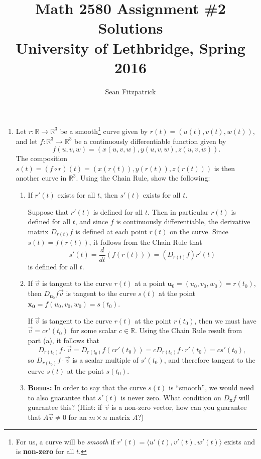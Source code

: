 \documentclass[letterpaper,12pt]{article}
\title{Math 2580 Assignment \#2 Solutions\\University of Lethbridge, Spring 2016}
\author{Sean Fitzpatrick}
\newcommand{\R}{\mathbb{R}}
\begin{document}
 \maketitle



\begin{enumerate}
 \item Let $r:\R\to \R^3$ be a smooth\footnote{For us, a curve will be {\em smooth} if $r'(t)=\langle u'(t), v'(t), w'(t)\rangle$ exists and is {\bf non-zero} for all $t$.} curve given by $r(t)=(u(t),v(t),w(t))$, and let $f:\R^3\to\R^3$ be a continuously differentiable function given by
\[
 f(u,v,w) = (x(u,v,w), y(u,v,w), z(u,v,w)).
\]
 The composition $s(t) = (f\circ r) (t) = (x(r(t)), y(r(t)), z(r(t)))$ is then another curve in $\R^3$. Using the Chain Rule, show the following:
\begin{enumerate}
 \item If $r'(t)$ exists for all $t$, then $s'(t)$ exists for all $t$.
 
\bigskip

Suppose that $r'(t)$ is defined for all $t$. Then in particular $r(t)$ is defined for all $t$, and since $f$ is continuously differentiable, the derivative matrix $D_{r(t)}f$ is defined at each point $r(t)$ on the curve. Since $s(t)=f(r(t))$, it follows from the Chain Rule that
\[
 s'(t) = \frac{d}{dt}(f(r(t))) = (D_{r(t)}f)r'(t)
\]
is defined for all $t$.

\bigskip


 \item If $\vec{v}$ is tangent to the curve $r(t)$ at a point $\mathbf{u}_0=(u_0,v_0,w_0) = r(t_0)$, then $D_{\mathbf{u}_0}f\vec{v}$ is tangent to the curve $s(t)$ at the point $\mathbf{x_0} = f(u_0,v_0,w_0) = s(t_0)$.

\bigskip

If $\vec{v}$ is tangent to the curve $r(t)$ at the point $r(t_0)$, then we must have $\vec{v} = cr'(t_0)$ for some scalar $c\in\R$. Using the Chain Rule result from part (a), it follows that
\[
 D_{r(t_0)}f\cdot \vec{v} = D_{r(t_0)}f(cr'(t_0)) = c D_{r(t_0)}f\cdot r'(t_0) = c s'(t_0),
\]
so $D_{r(t_0)}f\cdot \vec{v}$ is a scalar multiple of $s'(t_0)$, and therefore tangent to the curve $s(t)$ at the point $s(t_0)$.

 \item {\bf Bonus:} In order to say that the curve $s(t)$ is ``smooth'', we would need to also guarantee that $s'(t)$ is never zero. What condition on $D_{\mathbf{x}}f$ will guarantee this? (Hint: if $\vec{v}$ is a non-zero vector, how can you guarantee that $A\vec{v}\neq 0$ for an $m\times n$ matrix $A$?)


\end{enumerate}
\end{enumerate}
\end{document}
